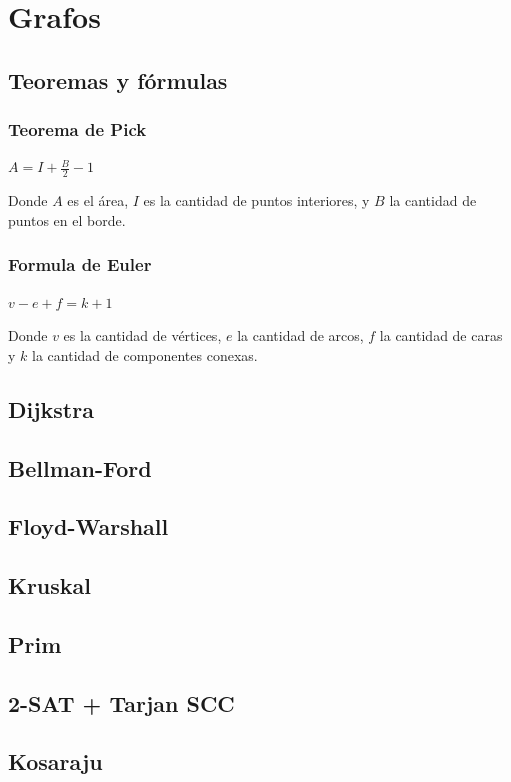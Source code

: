 {\section{Grafos}%
\subsection{Teoremas y fórmulas}
{
\subsubsection{Teorema de Pick}
{
$A=I+\frac{B}{2}-1$

Donde \(A\) es el área, \(I\) es la cantidad de puntos interiores, y \(B\) la cantidad de puntos en el borde.
}

\subsubsection{Formula de Euler}
{
$v-e+f=k+1$

Donde \(v\) es la cantidad de vértices, \(e\) la cantidad de arcos, \(f\) la cantidad de caras y \(k\) la cantidad de componentes conexas.
}
}
\subsection{Dijkstra}
\subsection{Bellman-Ford}
\subsection{Floyd-Warshall}
\subsection{Kruskal}
\subsection{Prim}
\subsection{2-SAT + Tarjan SCC}
\subsection{Kosaraju}
}
